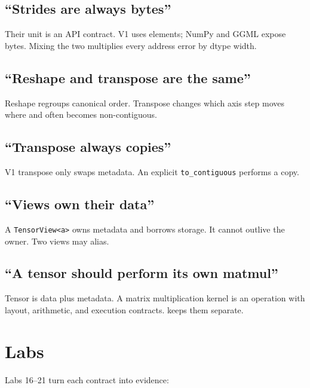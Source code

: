 \subsection{``Strides are always
bytes''}\label{strides-are-always-bytes}

Their unit is an API contract. V1 uses elements; NumPy and GGML expose
bytes. Mixing the two multiplies every address error by dtype width.

\subsection{``Reshape and transpose are the
same''}\label{reshape-and-transpose-are-the-same}

Reshape regroups canonical order. Transpose changes which axis step
moves where and often becomes non-contiguous.

\subsection{``Transpose always
copies''}\label{transpose-always-copies}

V1 transpose only swaps metadata. An explicit \texttt{to\_contiguous}
performs a copy.

\subsection{``Views own their data''}\label{views-own-their-data}

A \texttt{TensorView\textless{}\textquotesingle{}a\textgreater{}} owns
metadata and borrows storage. It cannot outlive the owner. Two views may
alias.

\subsection{``A tensor should perform its own
matmul''}\label{a-tensor-should-perform-its-own-matmul}

Tensor is data plus metadata. A matrix multiplication kernel is an
operation with layout, arithmetic, and execution contracts. 
keeps them separate.

\section{Labs}\label{labs-1}

Labs 16--21 turn each contract into evidence:

